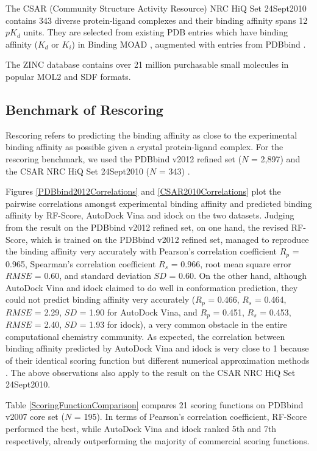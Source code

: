 \documentclass[10pt]{article}
\begin{document}
The CSAR (Community Structure Activity Resource) NRC HiQ Set 24Sept2010 contains 343 diverse protein-ligand complexes and their binding affinity spans 12 $pK_d$ units. They are selected from existing PDB \cite{540,537} entries which have binding affinity ($K_d$ or $K_i$) in Binding MOAD \cite{517,518}, augmented with entries from PDBbind \cite{529,530}.

The ZINC database contains over 21 million purchasable small molecules in popular MOL2 and SDF formats.

\subsection*{Benchmark of Rescoring}
Rescoring refers to predicting the binding affinity as close to the experimental binding affinity as possible given a crystal protein-ligand complex. For the rescoring benchmark, we used the PDBbind v2012 \cite{529,530} refined set ($N$ = 2,897) and the CSAR NRC HiQ Set 24Sept2010 ($N$ = 343) \cite{857,960}.

Figures \ref{PDBbind2012Correlations} and \ref{CSAR2010Correlations} plot the pairwise correlations amongst experimental binding affinity and predicted binding affinity by RF-Score, AutoDock Vina and idock on the two datasets. Judging from the result on the PDBbind v2012 refined set, on one hand, the revised RF-Score, which is trained on the PDBbind v2012 refined set, managed to reproduce the binding affinity very accurately with Pearson's correlation coefficient $R_p$ = 0.965, Spearman's correlation coefficient $R_s$ = 0.966, root mean square error $RMSE$ = 0.60, and standard deviation $SD$ = 0.60. On the other hand, although AutoDock Vina and idock claimed to do well in conformation prediction, they could not predict binding affinity very accurately ($R_p$ = 0.466, $R_s$ = 0.464, $RMSE$ = 2.29, $SD$ = 1.90 for AutoDock Vina, and $R_p$ = 0.451, $R_s$ = 0.453, $RMSE$ = 2.40, $SD$ = 1.93 for idock), a very common obstacle in the entire computational chemistry community. As expected, the correlation between binding affinity predicted by AutoDock Vina and idock is very close to 1 because of their identical scoring function but different numerical approximation methods \cite{1153}. The above observations also apply to the result on the CSAR NRC HiQ Set 24Sept2010.

Table \ref{ScoringFunctionComparison} compares 21 scoring functions on PDBbind v2007 core set ($N$ = 195). In terms of Pearson's correlation coefficient, RF-Score performed the best, while AutoDock Vina and idock ranked 5th and 7th respectively, already outperforming the majority of commercial scoring functions.
\end{document}
